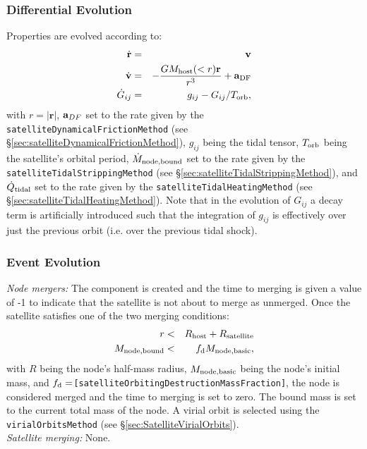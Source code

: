 \subsubsection{Differential Evolution}

Properties are evolved according to:
\begin{eqnarray}
\dot{\mathbf{r}}&=&\mathbf{v}\\
\dot{\mathbf{v}}&=&-\frac{G M_{\rm host}(<r)\mathbf{r}}{r^3}+{\bf a}_{\rm DF}\\
\dot{G}_{ij}&=&g_{ij}-G_{ij}/T_{\rm orb},
\end{eqnarray}
with $r=|\mathbf{r}|$, ${\bf a}_{DF}$ set to the rate given by the {\tt satelliteDynamicalFrictionMethod} (see \S\ref{sec:satelliteDynamicalFrictionMethod}), $g_{ij}$ being the tidal tensor, $T_{\rm orb}$ being the satellite's orbital period, $\dot{M}_{\rm node,bound}$ set to the rate given by the {\tt satelliteTidalStrippingMethod} (see \S\ref{sec:satelliteTidalStrippingMethod}), and $\dot{Q}_{\rm tidal}$ set to the rate given by the {\tt satelliteTidalHeatingMethod} (see \S\ref{sec:satelliteTidalHeatingMethod}). Note that in the evolution of $G_{ij}$ a decay term is artificially introduced such that the integration of $g_{ij}$ is effectively over just the previous orbit (i.e. over the previous tidal shock).

\subsubsection{Event Evolution}

\noindent\emph{Node mergers:} The \gls{component} is created and the time to merging is given a value of -1 to indicate that the satellite is not about to merge as unmerged.  Once the satellite satisfies one of the two merging conditions:
\begin{eqnarray}
r&<&R_{\rm host}+R_{\rm satellite}\\
M_{\rm node,bound}&<&f_{\rm d} M_{\rm node,basic},
\end{eqnarray}
with $R$ being the node's half-mass radius, $M_{\rm node,basic}$ being the node's initial mass, and $f_{\rm d}=${\tt [satelliteOrbitingDestructionMassFraction]}, the node is considered merged and the time to merging is set to zero. The bound mass is set to the current total mass of the node. A virial orbit is selected using the {\tt virialOrbitsMethod} (see \S\ref{sec:SatelliteVirialOrbits}). \\

\noindent\emph{Satellite merging:} None.\\

